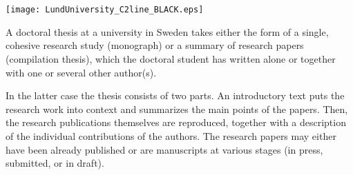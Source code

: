 


\cleardoublepage
\thispagestyle{empty} %
~
\vspace*{0.80cm}
\begin{center}
  {\Huge \myMainTitle}
  \\[2mm]
  {\Large \mySubTitle}

  \vspace*{6ex}

  {\Large\myName}

  \vspace*{6ex}
  \texttt{[image: LundUniversity\_C2line\_BLACK.eps]}
\end{center}
\vfill


\newpage

\thispagestyle{empty} %

\noindent A doctoral thesis at a university in Sweden takes either the form of a single,
cohesive research study (monograph) or a summary of research papers
(compilation thesis), which the doctoral student has written alone or together
with one or several other author(s).

In the latter case the thesis consists of two parts. An introductory text puts
the research work into context and summarizes the main points of the papers.
Then, the research publications themselves are reproduced, together
with a description of the individual contributions of the authors. The
research papers may either have been already published or are manuscripts at
various stages (in press, submitted, or in draft).


